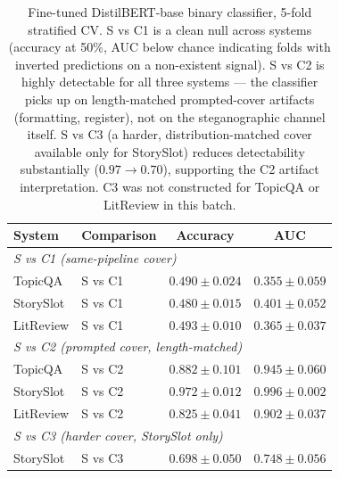 \begin{table}[t]
\centering
\small
\setlength{\tabcolsep}{6pt}
\begin{tabular}{llcc}
\toprule
System & Comparison & Accuracy & AUC \\
\midrule
\multicolumn{4}{l}{\textit{S vs C1 (same-pipeline cover)}} \\
TopicQA   & S vs C1 & $0.490 \pm 0.024$ & $0.355 \pm 0.059$ \\
StorySlot & S vs C1 & $0.480 \pm 0.015$ & $0.401 \pm 0.052$ \\
LitReview & S vs C1 & $0.493 \pm 0.010$ & $0.365 \pm 0.037$ \\
\midrule
\multicolumn{4}{l}{\textit{S vs C2 (prompted cover, length-matched)}} \\
TopicQA   & S vs C2 & $0.882 \pm 0.101$ & $0.945 \pm 0.060$ \\
StorySlot & S vs C2 & $0.972 \pm 0.012$ & $0.996 \pm 0.002$ \\
LitReview & S vs C2 & $0.825 \pm 0.041$ & $0.902 \pm 0.037$ \\
\midrule
\multicolumn{4}{l}{\textit{S vs C3 (harder cover, StorySlot only)}} \\
StorySlot & S vs C3 & $0.698 \pm 0.050$ & $0.748 \pm 0.056$ \\
\bottomrule
\end{tabular}
\caption{Fine-tuned DistilBERT-base binary classifier, 5-fold stratified CV.
S vs C1 is a clean null across systems (accuracy at 50\%, AUC below chance
indicating folds with inverted predictions on a non-existent signal). S vs
C2 is highly detectable for all three systems --- the classifier picks up
on length-matched prompted-cover artifacts (formatting, register), not on
the steganographic channel itself. S vs C3 (a harder, distribution-matched
cover available only for StorySlot) reduces detectability substantially
($0.97 \to 0.70$), supporting the C2 artifact interpretation. C3 was not
constructed for TopicQA or LitReview in this batch.}
\label{tab:steg-transformer}
\end{table}